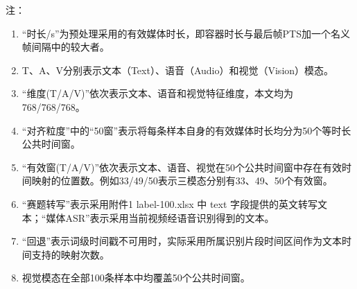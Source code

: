 \par\vspace{0.2em}\noindent\begin{minipage}{\textwidth}{\footnotesize\noindent 注：\par\begin{enumerate}[label=(\arabic*),leftmargin=2.4em,labelsep=.4em,itemsep=0pt,topsep=0pt,parsep=0pt]
\item “时长/s”为预处理采用的有效媒体时长，即容器时长与最后帧PTS加一个名义帧间隔中的较大者。
\item T、A、V分别表示文本（Text）、语音（Audio）和视觉（Vision）模态。
\item “维度(T/A/V)”依次表示文本、语音和视觉特征维度，本文均为768/768/768。
\item “对齐粒度”中的“50窗”表示将每条样本自身的有效媒体时长均分为50个等时长公共时间窗。
\item “有效窗(T/A/V)”依次表示文本、语音、视觉在50个公共时间窗中存在有效时间映射的位置数。例如33/49/50表示三模态分别有33、49、50个有效窗。
\item “赛题转写”表示采用附件1 label-100.xlsx 中 text 字段提供的英文转写文本；“媒体ASR”表示采用当前视频经语音识别得到的文本。
\item “回退”表示词级时间戳不可用时，实际采用所属识别片段时间区间作为文本时间支持的映射次数。
\item 视觉模态在全部100条样本中均覆盖50个公共时间窗。
\end{enumerate}}\end{minipage}

